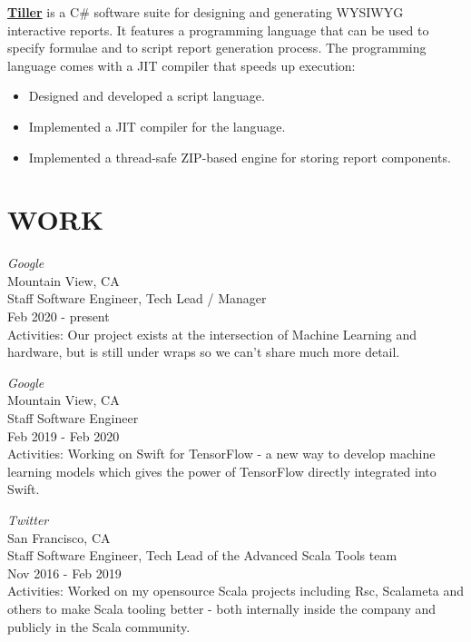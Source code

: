 \documentclass[margin, 10pt]{Stylesheet}
\begin{document}
\begin{resume}
\textbf{\href{http://code.google.com/p/elf4b/}{Tiller}} is a C\# software suite for designing and
generating WYSIWYG interactive reports. It features a programming language that can be used to
specify formulae and to script report generation process. The programming language comes with
a JIT compiler that speeds up execution:

\begin{itemize} \itemsep -2pt
\item Designed and developed a script language.
\item Implemented a JIT compiler for the language.
\item Implemented a thread-safe ZIP-based engine for storing report components.
\end{itemize}

\section{WORK}

\emph{Google}\\
Mountain View, CA \\
Staff Software Engineer, Tech Lead / Manager \\
Feb 2020 - present\\
Activities: Our project exists at the intersection of Machine Learning and hardware,
but is still under wraps so we can't share much more detail.

\emph{Google}\\
Mountain View, CA \\
Staff Software Engineer \\
Feb 2019 - Feb 2020\\
Activities: Working on Swift for TensorFlow - a new way to develop machine learning models which
gives the power of TensorFlow directly integrated into Swift.

\emph{Twitter}\\
San Francisco, CA \\
Staff Software Engineer, Tech Lead of the Advanced Scala Tools team \\
Nov 2016 - Feb 2019 \\
Activities: Worked on my opensource Scala projects including Rsc, Scalameta and others to make
Scala tooling better - both internally inside the company and publicly in the Scala community.


\end{resume}
\end{document}
